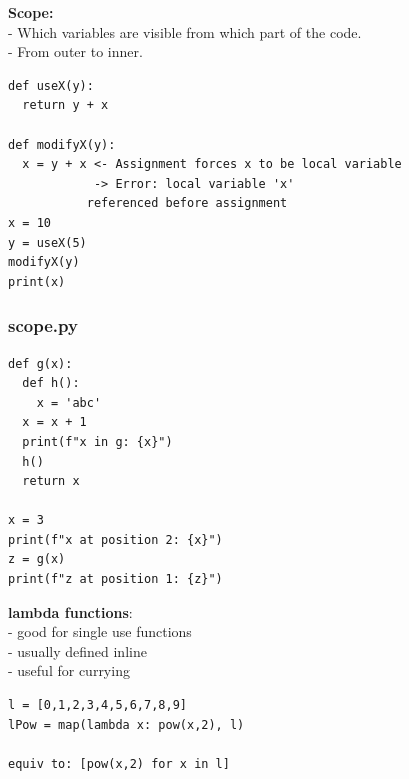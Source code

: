 \documentclass{beamer}
\begin{document}
\begin{frame}[fragile]
	\textbf{Scope:}\\
	- Which variables are visible from which part of the code.\\
	- From outer to inner.\\
	\begin{example}
		\begin{verbatim}
def useX(y):
  return y + x
		
def modifyX(y):  
  x = y + x <- Assignment forces x to be local variable
            -> Error: local variable 'x'
	       referenced before assignment
x = 10
y = useX(5)
modifyX(y)
print(x)
		\end{verbatim}
	\end{example}
\end{frame}

\begin{frame}[fragile]
	\frametitle{scope.py}
	\begin{example}
		\begin{verbatim}
def g(x):
  def h():
	x = 'abc'
  x = x + 1
  print(f"x in g: {x}")
  h()
  return x
		
x = 3
print(f"x at position 2: {x}")
z = g(x)
print(f"z at position 1: {z}")
		\end{verbatim}
	\end{example}
\end{frame}

\begin{frame}[fragile]
	\textbf{lambda functions}:\\
	- good for single use functions\\
	- usually defined inline\\
	- useful for currying
\begin{example}{}
\begin{verbatim}
l = [0,1,2,3,4,5,6,7,8,9]
lPow = map(lambda x: pow(x,2), l)

equiv to: [pow(x,2) for x in l]	

\end{verbatim}
\end{example}
\end{frame}
\end{document}
